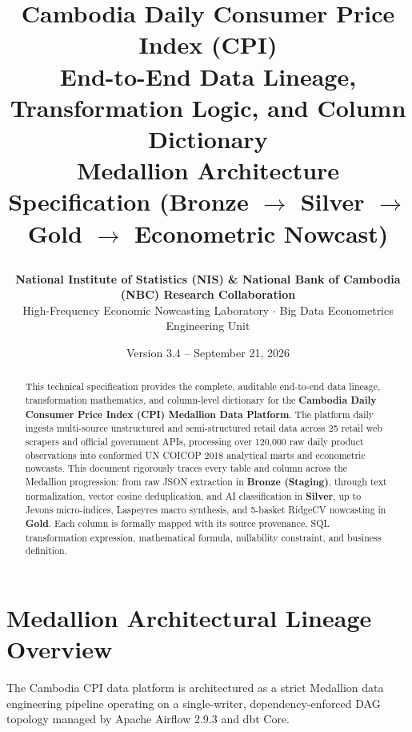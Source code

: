 \documentclass[a4paper, 11pt]{article}
\title{\vspace{-1.2cm}
\begin{tcolorbox}[colback=primaryblue, colframe=primaryblue, arc=2mm]
\centering \color{white}
{\Huge \textbf{Cambodia Daily Consumer Price Index (CPI)}}\\[6pt]
{\Large End-to-End Data Lineage, Transformation Logic, and Column Dictionary}\\[4pt]
{\large Medallion Architecture Specification (Bronze $\to$ Silver $\to$ Gold $\to$ Econometric Nowcast)}
\end{tcolorbox}
\vspace{-0.5cm}}
\author{\textbf{National Institute of Statistics (NIS) \& National Bank of Cambodia (NBC) Research Collaboration}\\[2pt]
\small High-Frequency Economic Nowcasting Laboratory $\cdot$ Big Data Econometrics Engineering Unit}
\date{\small Version 3.4 -- September 21, 2026}
\begin{document}
\maketitle

\begin{abstract}
\noindent This technical specification provides the complete, auditable end-to-end data lineage, transformation mathematics, and column-level dictionary for the \textbf{Cambodia Daily Consumer Price Index (CPI) Medallion Data Platform}. The platform daily ingests multi-source unstructured and semi-structured retail data across 25 retail web scrapers and official government APIs, processing over 120,000 raw daily product observations into conformed UN COICOP 2018 analytical marts and econometric nowcasts. This document rigorously traces every table and column across the Medallion progression: from raw JSON extraction in \textbf{Bronze (Staging)}, through text normalization, vector cosine deduplication, and AI classification in \textbf{Silver}, up to Jevons micro-indices, Laspeyres macro synthesis, and 5-basket RidgeCV nowcasting in \textbf{Gold}. Each column is formally mapped with its source provenance, SQL transformation expression, mathematical formula, nullability constraint, and business definition.
\end{abstract}

\vspace{0.3cm}
\tableofcontents
\newpage

\section{Medallion Architectural Lineage Overview}

The Cambodia CPI data platform is architectured as a strict Medallion data engineering pipeline operating on a single-writer, dependency-enforced DAG topology managed by Apache Airflow 2.9.3 and dbt Core. 
\end{document}
